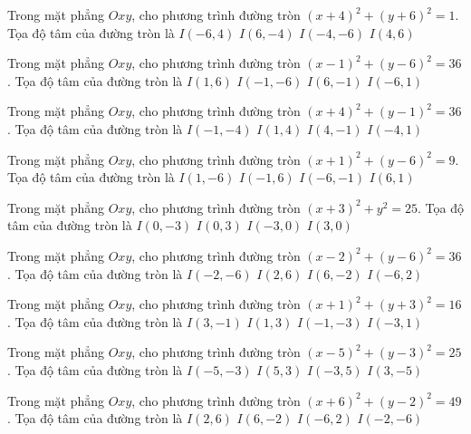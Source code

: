 \begin{ex}
Trong mặt phẳng $Oxy$, cho phương trình đường tròn $(x + 4)^2  + (y + 6)^2 = 1$. Tọa độ tâm của đường tròn là
\choice
{ $I(-6, 4)$ }
{ $I(6, -4)$ }
{ \True $I(-4, -6)$ }
{ $I(4, 6)$ }
\end{ex}

\begin{ex}
Trong mặt phẳng $Oxy$, cho phương trình đường tròn $(x -1)^2   + (y -6)^2 = 36$. Tọa độ tâm của đường tròn là
\choice
{ \True $I(1, 6)$ }
{ $I(-1, -6)$ }
{ $I(6, -1)$ }
{ $I(-6, 1)$ }
\end{ex}

\begin{ex}
Trong mặt phẳng $Oxy$, cho phương trình đường tròn $(x + 4)^2  + (y -1)^2 = 36$. Tọa độ tâm của đường tròn là
\choice
{ $I(-1, -4)$ }
{ $I(1, 4)$ }
{ $I(4, -1)$ }
{ \True $I(-4, 1)$ }
\end{ex}

\begin{ex}
Trong mặt phẳng $Oxy$, cho phương trình đường tròn $(x + 1)^2  + (y -6)^2 = 9$. Tọa độ tâm của đường tròn là
\choice
{ $I(1, -6)$ }
{ \True $I(-1, 6)$ }
{ $I(-6, -1)$ }
{ $I(6, 1)$ }
\end{ex}

\begin{ex}
Trong mặt phẳng $Oxy$, cho phương trình đường tròn $(x + 3)^2  + y^2 = 25$. Tọa độ tâm của đường tròn là
\choice
{ $I(0, -3)$ }
{ $I(0, 3)$ }
{ \True $I(-3, 0)$ }
{ $I(3, 0)$ }
\end{ex}

\begin{ex}
Trong mặt phẳng $Oxy$, cho phương trình đường tròn $(x -2)^2   + (y -6)^2 = 36$. Tọa độ tâm của đường tròn là
\choice
{ $I(-2, -6)$ }
{ \True $I(2, 6)$ }
{ $I(6, -2)$ }
{ $I(-6, 2)$ }
\end{ex}

\begin{ex}
Trong mặt phẳng $Oxy$, cho phương trình đường tròn $(x + 1)^2  + (y + 3)^2 = 16$. Tọa độ tâm của đường tròn là
\choice
{ $I(3, -1)$ }
{ $I(1, 3)$ }
{ \True $I(-1, -3)$ }
{ $I(-3, 1)$ }
\end{ex}

\begin{ex}
Trong mặt phẳng $Oxy$, cho phương trình đường tròn $(x -5)^2   + (y -3)^2 = 25$. Tọa độ tâm của đường tròn là
\choice
{ $I(-5, -3)$ }
{ \True $I(5, 3)$ }
{ $I(-3, 5)$ }
{ $I(3, -5)$ }
\end{ex}

\begin{ex}
Trong mặt phẳng $Oxy$, cho phương trình đường tròn $(x + 6)^2  + (y -2)^2 = 49$. Tọa độ tâm của đường tròn là
\choice
{ $I(2, 6)$ }
{ $I(6, -2)$ }
{ \True $I(-6, 2)$ }
{ $I(-2, -6)$ }
\end{ex}

